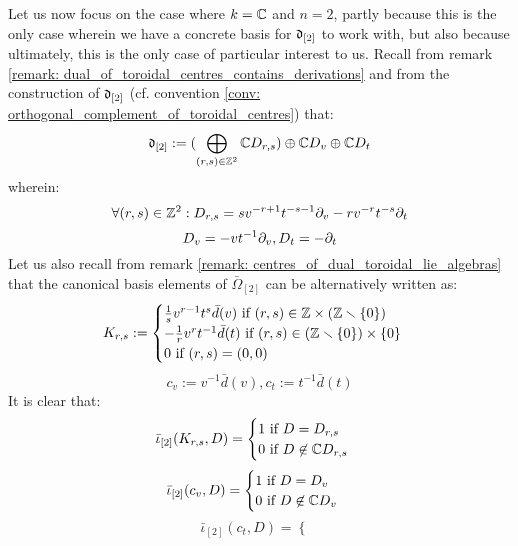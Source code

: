 \begin{remark}
            Let us now focus on the case where $k = \bbC$ and $n = 2$, partly because this is the only case wherein we have a concrete basis for $\d_{[2]}$ to work with, but also because ultimately, this is the only case of particular interest to us. Recall from remark \ref{remark: dual_of_toroidal_centres_contains_derivations} and from the construction of $\d_{[2]}$ (cf. convention \ref{conv: orthogonal_complement_of_toroidal_centres}) that:
                $$\d_{[2]} := (\bigoplus_{(r, s) \in \Z^2} \bbC D_{r, s}) \oplus \bbC D_v \oplus \bbC D_t$$
            wherein:
                $$\forall (r, s) \in \Z^2: D_{r, s} = s v^{-r + 1} t^{-s - 1} \del_v - r v^{-r} t^{-s} \del_t$$
                $$D_v = -v t^{-1} \del_v, D_t = -\del_t$$
            Let us also recall from remark \ref{remark: centres_of_dual_toroidal_lie_algebras} that the canonical basis elements of $\bar{\Omega}_{[2]}$ can be alternatively written as:
                $$
                    K_{r, s} :=
                    \begin{cases}
                        \text{$\frac1s v^{r - 1} t^s \bar{d}(v)$ if $(r, s) \in \Z \x (\Z \setminus \{0\})$}
                        \\
                        \text{$-\frac1r v^r t^{-1} \bar{d}(t)$ if $(r, s) \in (\Z \setminus \{0\}) \x \{0\}$}
                        \\
                        \text{$0$ if $(r, s) = (0, 0)$}
                    \end{cases}
                $$
                $$c_v := v^{-1} \bar{d}(v), c_t := t^{-1} \bar{d}(t)$$
            It is clear that:
                $$
                    \bar{\iota}_{[2]}( K_{r, s}, D ) =
                    \begin{cases}
                        \text{$1$ if $D = D_{r, s}$}
                        \\
                        \text{$0$ if $D \not \in \bbC D_{r, s}$}
                    \end{cases}
                $$
                $$
                    \bar{\iota}_{[2]}( c_v, D ) =
                    \begin{cases}
                        \text{$1$ if $D = D_v$}
                        \\
                        \text{$0$ if $D \not \in \bbC D_v$}
                    \end{cases}
                $$
                $$
                    \bar{\iota}_{[2]}( c_t, D ) =
                    \begin{cases}

\end{cases}$$
\end{remark}
